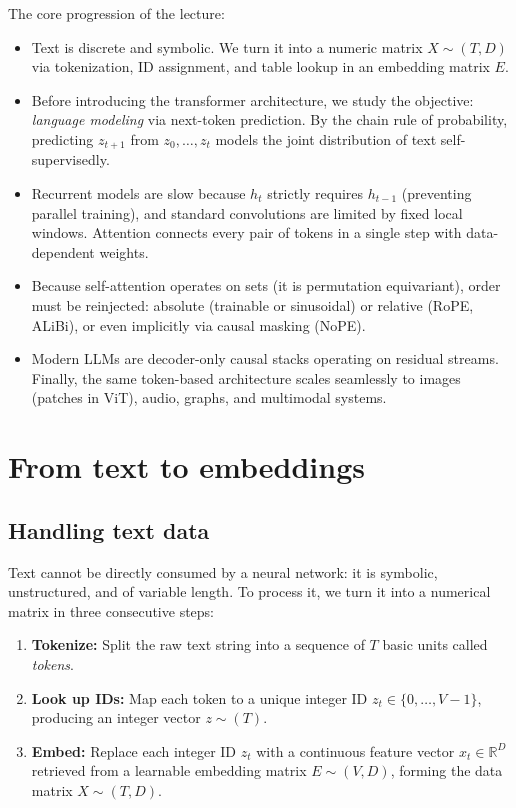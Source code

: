 \documentclass[11pt,a4paper]{article}
\newcommand{\R}{\mathbb{R}}
\newcommand{\slides}[1]{\par\nopagebreak\noindent{\normalfont\small\emph{(slides #1)}}\par\nopagebreak\vspace{2pt}}
\theoremstyle{definition}
\theoremstyle{plain}
\begin{document}
\begin{intuition}
The core progression of the lecture:
\begin{itemize}[nosep]
\item Text is discrete and symbolic. We turn it into a numeric matrix $X \sim (T, D)$ via tokenization, ID assignment, and table lookup in an embedding matrix $E$.
\item Before introducing the transformer architecture, we study the objective: \emph{language modeling} via next-token prediction. By the chain rule of probability, predicting $z_{t+1}$ from $z_0, \dots, z_t$ models the joint distribution of text self-supervisedly.
\item Recurrent models are slow because $h_t$ strictly requires $h_{t-1}$ (preventing parallel training), and standard convolutions are limited by fixed local windows. Attention connects every pair of tokens in a single step with data-dependent weights.
\item Because self-attention operates on sets (it is permutation equivariant), order must be reinjected: absolute (trainable or sinusoidal) or relative (RoPE, ALiBi), or even implicitly via causal masking (NoPE).
\item Modern LLMs are decoder-only causal stacks operating on residual streams. Finally, the same token-based architecture scales seamlessly to images (patches in ViT), audio, graphs, and multimodal systems.
\end{itemize}
\end{intuition}

\section{From text to embeddings}\slides{2--10 / 84}

\subsection{Handling text data}\slides{2 / 84}
Text cannot be directly consumed by a neural network: it is symbolic, unstructured, and of variable length. To process it, we turn it into a numerical matrix in three consecutive steps:
\begin{enumerate}
\item \textbf{Tokenize:} Split the raw text string into a sequence of $T$ basic units called \emph{tokens}.
\item \textbf{Look up IDs:} Map each token to a unique integer ID $z_t \in \{0, \dots, V-1\}$, producing an integer vector $z \sim (T)$.
\item \textbf{Embed:} Replace each integer ID $z_t$ with a continuous feature vector $x_t \in \R^D$ retrieved from a learnable embedding matrix $E \sim (V, D)$, forming the data matrix $X \sim (T, D)$.
\end{enumerate}
\end{document}
